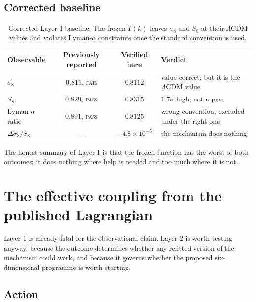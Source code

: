 \documentclass[11pt,a4paper]{article}
\newcommand{\LCDM}{\Lambda\mathrm{CDM}}
\begin{document}
\subsection{Corrected baseline}

\begin{table}[htb]
\centering
\small
\begin{tabular}{lccl}
\toprule
Observable & Previously reported & Verified here & Verdict\\
\midrule
$\sigma_8$ & $0.811$, \textsc{fail} & $0.8112$ & value correct; but it is the
$\LCDM$ value\\
$S_8$ & $0.829$, \textsc{pass} & $0.8315$ & $1.7\sigma$ high; not a pass\\
Lyman-$\alpha$ ratio & $0.891$, \textsc{pass} & $0.8125$ & wrong convention;
excluded under the right one\\
$\Delta\sigma_8/\sigma_8$ & --- & $-4.8\times10^{-5}$ & the mechanism does nothing\\
\bottomrule
\end{tabular}
\caption{Corrected Layer-1 baseline. The frozen $T(k)$ leaves $\sigma_8$ and $S_8$
at their $\LCDM$ values and violates Lyman-$\alpha$ constraints once the standard
convention is used.}
\label{tab:corrected}
\end{table}

\noindent
The honest summary of Layer 1 is that the frozen function has the worst of both
outcomes: it does nothing where help is needed and too much where it is not.

\section{The effective coupling from the published Lagrangian}\label{sec:geff}

Layer 1 is already fatal for the observational claim. Layer 2 is worth testing
anyway, because the outcome determines whether any refitted version of the
mechanism could work, and because it governs whether the proposed
six-dimensional programme is worth starting.

\subsection{Action}
\end{document}

